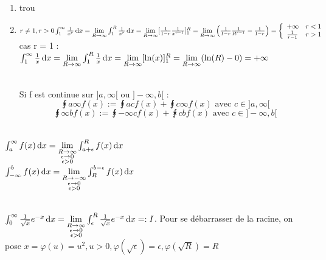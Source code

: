 \documentclass[12pt,a4paper]{article}
\begin{document}
{\begin{enumerate}
	\item {trou}
	\item $r \neq 1, r > 0 \int_{1}^{\infty} \frac{1}{x^r} \, \mathrm d x = \lim\limits_{R \to \infty}\int_{1}^{R} \frac{1}{x^r} \, \mathrm d x = \lim\limits_{R \to \infty} [\frac{1}{1-r} \frac{1}{x^{r-1}}]_1^R \\
	= \lim\limits_{R\to\infty}\left(\frac{1}{1-r}\frac{1}{R^{r-1}} - \frac{1}{1-r}\right) = \left\{
	\begin{array}{ll}
	+\infty & r < 1\\
	\frac{1}{r-1} & r > 1
	\end{array}\right.$\\
	cas r = 1 : $ \int_{1}^{\infty} \frac{1}{x} \, \mathrm d x = \lim\limits_{R \to \infty} \int_{1}^{R} \frac{1}{x} \, \mathrm d x\\
	 = \lim\limits_{R \to \infty}[\ln(x)]_1^R = \lim\limits_{R \to \infty}(\ln(R) - 0) = +\infty$
	 \begin{boite}
	 	\\
	 	Si f est continue sur $]a,\infty[$ ou $]-\infty,b[$ :
	 	\begin{equation}
	 		\intx{a}{\infty}{f(x)} := \intx{a}{c}{f(x)} + \intx{c}{\infty}{f(x)}\text{ avec } c \in ]a,\infty[
	 	\end{equation}
	 	\begin{equation}
	 		\intx{\infty}{b}{f(x)} := \intx{-\infty}{c}{f(x)} + \intx{c}{b}{f(x)} \text{ avec } c \in ]-\infty,b[
	 	\end{equation}
	 \end{boite}
\end{enumerate} 
\begin{boite}
\\
$\int_{a}^{\infty} f(x) \, \mathrm d x = \lim\limits_{\substack{R \to \infty \\ \epsilon \to 0 \\ \epsilon > 0}} \int_{a+\epsilon}^{R} f(x) \, \mathrm d x$\\
$\int_{-\infty}^{b} f(x) \, \mathrm d x = \lim\limits_{\substack{R \to -\infty \\ \epsilon \to 0 \\ \epsilon > 0}}
\int_{R}^{b-\epsilon} f(x) \, \mathrm d x$
\end{boite}
\\
$\int_{0}^{\infty} \frac{1}{\sqrt{x}}e^{-x} \, \mathrm d x = \lim\limits_{\substack{R \to \infty \\ \epsilon \to 0 \\ \epsilon > 0}} \int_{\epsilon}^{R} \frac{1}{\sqrt{x}} e^{-x} \, \mathrm d x =: I$. Pour se débarrasser de la racine, on pose $x = \varphi(u)= u^2, u > 0, \varphi(\sqrt{\epsilon}) = \epsilon, \varphi(\sqrt{R}) = R$\\
}
\end{document}
